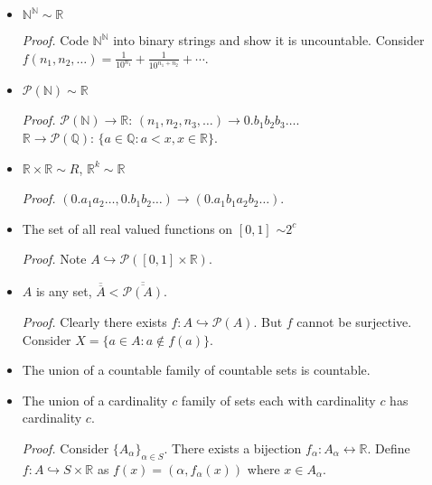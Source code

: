 \documentclass[%
 aip,
 jmp,%
 amsmath,amssymb,
 reprint,%
]{revtex4-1}
\def\R{{\mathbb R}}
\def\Q{{\mathbb Q}}
\def\N{{\mathbb N}}
\def\a{\alpha}
\renewenvironment{proof}{\color{gray}\footnotesize\emph{Proof.}}{}
\newcommand{\card}[1]{\overline{\overline{#1}}}
\newcommand{\inject}{\hookrightarrow}
\newcommand{\power}[1]{\mathcal P(#1)}
\begin{document}
\begin{enumerate}
\begin{itemize}
        \begin{proof}
          Consider $f(n_1, \dots, n_k) = p_1^{n_1}\cdots p_k^{n_k}$.
        \end{proof}

      \item $\N^{\N} \sim \R$

        \begin{proof}
          Code $\N^{\N}$ into binary strings and show it is uncountable. Consider
          $f(n_1, n_2, \dots) = \frac{1}{10^{n_1}}+\frac{1}{10^{n_1+n_2}}+\cdots$.
        \end{proof}

      \item $\power{\N} \sim \R$

          \begin{proof}
            $\power{\N} \to \R$: $(n_1,n_2,n_3,\dots) \to 0.b_1b_2b_3\dots $.\\
            $\R \to \power{\Q}$: $\{a \in \Q: a < x, x \in \R\}$.
          \end{proof}

      \item $\R\times\R \sim R$, $\R^k \sim \R$

          \begin{proof}
           $(0.a_1a_2\dots, 0.b_1b_2\dots) \to (0.a_1b_1a_2b_2\dots)$.
          \end{proof}

      \item The set of all real valued functions on $[0,1]$ $\sim 2^c$

          \begin{proof}
            Note $A \inject \power{[0,1]\times\R}$.
          \end{proof}

      \item $A$ is any set, $\card{A} < \card{\power{A}}$.

          \begin{proof}
            Clearly there exists $f: A \inject \power{A}$.
            But $f$ cannot be surjective. Consider
            $X = \{ a \in A: a \notin f(a) \}$.
          \end{proof}

      \item The union of a countable family of countable sets is countable.
      \item The union of a cardinality $c$ family of sets each with cardinality
      $c$ has cardinality $c$.

          \begin{proof}
            Consider $\{A_{\a}\}_{\a\in S}$.
            There exists a bijection $f_{\a}: A_{\a} \leftrightarrow \R$.
            Define $f: A \inject S\times\R$ as $f(x) = (\a, f_{\a}(x))$ where $x\in A_{\a}$.
          \end{proof}

    \end{itemize}

\end{enumerate}
\end{document}
